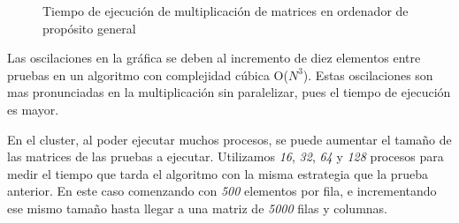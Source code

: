 		\begin{figure}[!h]
		\centering
		\caption{Tiempo de ejecución de multiplicación de matrices en ordenador de propósito general}
		\label{fig:mult_matrices}
		\end{figure}
		
		
		
		\newpage
		
		Las oscilaciones en la gráfica se deben al incremento de diez elementos entre pruebas en un algoritmo con complejidad cúbica O($N^{3}$). Estas oscilaciones son mas pronunciadas en la multiplicación sin paralelizar, pues el tiempo de ejecución es mayor.
		
		En el cluster, al poder ejecutar muchos procesos, se puede aumentar el tamaño de las matrices de las pruebas a ejecutar. Utilizamos \textit{16}, \textit{32}, \textit{64} y \textit{128} procesos para medir el tiempo que tarda el algoritmo con la misma estrategia que la prueba anterior. En este caso comenzando con \textit{500} elementos por fila, e incrementando ese mismo tamaño hasta llegar a una matriz de \textit{5000} filas y columnas. 
				
